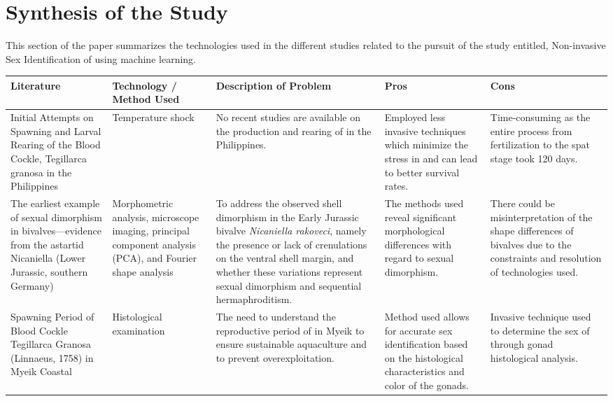 \section{Synthesis of the Study}
This section of the paper summarizes the technologies used in the different studies related to the pursuit of the study entitled, Non-invasive Sex Identification of \Tgranosa using machine learning.

\begin{landscape}
\begin{table}[]
	\centering
	\begin{adjustbox}{scale=0.5,center}
	\begin{tabular}{|p{5cm}|p{5cm}|p{8cm}|p{8cm}|p{8cm}|}
		\hline
		\textbf{Literature} &
		\textbf{Technology / Method Used} &
		\textbf{Description of Problem} &
		\textbf{Pros} &
		\textbf{Cons} \\ \hline
		
		Initial Attempts on Spawning and Larval Rearing of the Blood Cockle, Tegillarca granosa in the Philippines &
		Temperature shock &
		No recent studies are available on the production and rearing of \textit{\Tgranosa} in the Philippines. &
		Employed less invasive techniques which minimize the stress in \textit{\Tgranosa} and can lead to better survival rates. &
		Time-consuming as the entire process from fertilization to the spat stage took 120 days. \\ \hline
		
		The earliest example of sexual dimorphism in bivalves—evidence from the astartid Nicaniella (Lower Jurassic, southern Germany) &
		Morphometric analysis, microscope imaging, principal component analysis (PCA), and Fourier shape analysis &
		To address the observed shell dimorphism in the Early Jurassic bivalve \textit{Nicaniella rakoveci}, namely the presence or lack of crenulations on the ventral shell margin, and whether these variations represent sexual dimorphism and sequential hermaphroditism. &
		The methods used reveal significant morphological differences with regard to sexual dimorphism. &
		There could be misinterpretation of the shape differences of bivalves due to the constraints and resolution of technologies used. \\ \hline
		
		Spawning Period of Blood Cockle Tegillarca Granosa (Linnaeus, 1758) in Myeik Coastal &
		Histological examination &
		The need to understand the reproductive period of \textit{\Tgranosa} in Myeik to ensure sustainable aquaculture and to prevent overexploitation. &
		Method used allows for accurate sex identification based on the histological characteristics and color of the gonads. &
		Invasive technique used to determine the sex of \textit{\Tgranosa} through gonad histological analysis. \\ \hline
		

\end{tabular}
\end{adjustbox}
\end{table}
\end{landscape}
